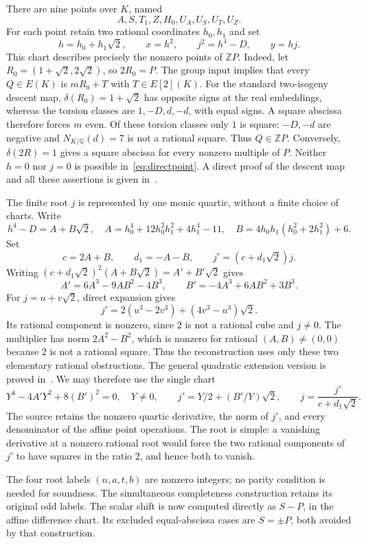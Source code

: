 \documentclass[11pt,a4paper]{article}
\newcommand{\Q}{\mathbb Q}\newcommand{\Z}{\mathbb Z}
\begin{document}
There are nine points over $K$, named
\[
 A,S,T_1,Z,H_0,U_A,U_S,U_T,U_Z.
\]
For each point retain two rational coordinates $h_0,h_1$ and set
\begin{equation}\label{eq:directpoint}
 h=h_0+h_1\sqrt2,\qquad x=h^2,\qquad
 j^2=h^4-D,\qquad y=hj.
\end{equation}
This chart describes precisely the nonzero points of $\Z P$.
Indeed, let $R_0=(1+\sqrt2,2\sqrt2)$, so $2R_0=P$.
The group input implies that every $Q\in E(K)$ is $mR_0+T$
with $T\in E[2](K)$. For the standard two-isogeny descent map,
$\delta(R_0)=1+\sqrt2$ has opposite signs at the real embeddings,
whereas the torsion classes are $1,-D,d,-d$, with equal signs.
A square abscissa therefore forces $m$ even. Of these torsion
classes only $1$ is square: $-D,-d$ are negative and
$N_{K/\Q}(d)=7$ is not a rational square. Thus $Q\in\Z P$.
Conversely, $\delta(2R)=1$ gives a square abscissa for every
nonzero multiple of $P$. Neither $h=0$ nor $j=0$ is possible
in~\eqref{eq:directpoint}. A direct proof of the descent map
and all these assertions is given in~\cite{SquareCharts}.

The finite root $j$ is represented by one monic quartic,
without a finite choice of charts. Write
\[
 h^4-D=A+B\sqrt2,
 \quad A=h_0^4+12h_0^2h_1^2+4h_1^4-11,
 \quad B=4h_0h_1(h_0^2+2h_1^2)+6.
\]
Set
\[
 c=2A+B,\qquad d_1=-A-B,\qquad j'=(c+d_1\sqrt2)j.
\]
Writing $(c+d_1\sqrt2)^2(A+B\sqrt2)=A'+B'\sqrt2$ gives
\[
 A'=6A^3-9AB^2-4B^3,\qquad
 B'=-4A^3+6AB^2+3B^3.
\]
For $j=u+v\sqrt2$, direct expansion gives
\[
 j'=2(u^3-2v^3)+(4v^3-u^3)\sqrt2.
\]
Its rational component is nonzero, since $2$ is not a rational
cube and $j\ne0$. The multiplier has norm $2A^2-B^2$,
which is nonzero for rational $(A,B)\ne(0,0)$ because $2$
is not a rational square. Thus the reconstruction uses only
these two elementary rational obstructions. The general quadratic
extension version is proved in~\cite{QuadraticCharts}.
We may therefore use the single chart
\begin{equation}\label{eq:pointquartic}
 Y^4-4A'Y^2+8(B')^2=0,\quad Y\ne0,\qquad
 j'=Y/2+(B'/Y)\sqrt2,\qquad
 j=\frac{j'}{c+d_1\sqrt2}.
\end{equation}
The source retains the nonzero quartic derivative, the norm of
$j'$, and every denominator of the affine point operations.
The root is simple: a vanishing derivative at a nonzero rational
root would force the two rational components of $j'$ to have
squares in the ratio $2$, and hence both to vanish.

The four root labels $(n,a,t,b)$ are nonzero integers; no parity
condition is needed for soundness. The simultaneous completeness
construction retains its original odd labels. The scalar shift
is now computed directly as $S-P$, in the affine difference
chart. Its excluded equal-abscissa cases are $S=\pm P$, both
avoided by that construction.
\end{document}
